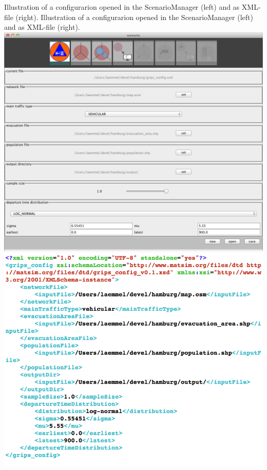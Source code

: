 \createfigure%
{Illustration of a configurarion opened in the \mbox{ScenarioManager} (left) and as XML-file (right).}%
{Illustration of a configurarion opened in the \mbox{ScenarioManager} (left) and as XML-file (right).}%
{\label{chap:evac:fig:sc_man}}%
{%
  \createsubfigure%
  {}%
{\includegraphics[width=.475\linewidth]{extending/figures/Evacuation/grips_config}}
  {}%
  {}%
  \createsubfigure%
  {}%
{\includegraphics[width=.475\linewidth]{extending/figures/Evacuation/grips_config_xml}}
  {}%
  {}%
}%
  {}%

